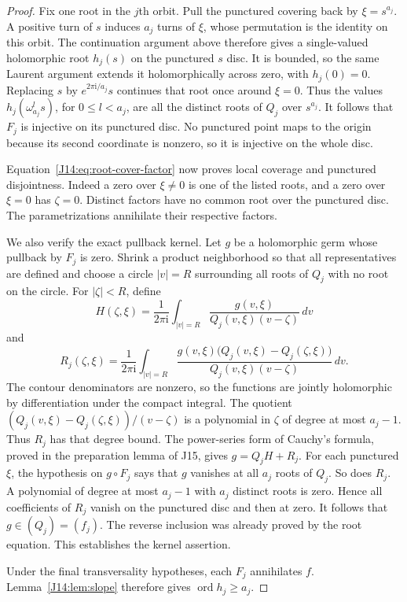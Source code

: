 \documentclass[11pt,oneside]{report}
\theoremstyle{definition}
\numberwithin{equation}{section}
\newcommand{\ord}{\operatorname{ord}}
\newcommand{\ii}{\mathrm i}
\begin{document}
\begin{proof}
Fix one root in the $j$th orbit. Pull the punctured covering back by
$\xi=s^{a_j}$. A positive turn of $s$ induces $a_j$ turns of $\xi$,
whose permutation is the identity on this orbit. The continuation
argument above therefore gives a single-valued holomorphic root
$h_j(s)$ on the punctured $s$ disc. It is bounded, so the same
Laurent argument extends it holomorphically across zero, with
$h_j(0)=0$. Replacing $s$ by $e^{2\pi\ii/a_j}s$ continues that root
once around $\xi=0$. Thus the values $h_j(\omega_{a_j}^l s)$, for
$0\leq l<a_j$, are all the distinct roots of $Q_j$ over $s^{a_j}$.
It follows that $F_j$ is injective on its punctured disc.
No punctured point maps to the origin because its second coordinate
is nonzero, so it is injective on the whole disc.

Equation~\eqref{J14:eq:root-cover-factor} now proves local coverage and
punctured disjointness. Indeed a zero over $\xi\ne0$ is one of the
listed roots, and a zero over $\xi=0$ has $\zeta=0$.
Distinct factors have no common root over the punctured disc.
The parametrizations annihilate their respective factors.

We also verify the exact pullback kernel. Let $g$ be a holomorphic
germ whose pullback by $F_j$ is zero. Shrink a product neighborhood
so that all representatives are defined and choose a circle
$|v|=R$ surrounding all roots of $Q_j$ with no root on the circle.
For $|\zeta|<R$, define
\[
 H(\zeta,\xi)=\frac1{2\pi\ii}\int_{|v|=R}
       \frac{g(v,\xi)}{Q_j(v,\xi)(v-\zeta)}\,dv
\]
and
\[
 R_j(\zeta,\xi)=\frac1{2\pi\ii}\int_{|v|=R}
 \frac{g(v,\xi)\bigl(Q_j(v,\xi)-Q_j(\zeta,\xi)\bigr)}
      {Q_j(v,\xi)(v-\zeta)}\,dv.
\]
The contour denominators are nonzero, so the functions are jointly
holomorphic by differentiation under the compact integral.
The quotient
$(Q_j(v,\xi)-Q_j(\zeta,\xi))/(v-\zeta)$ is a polynomial in
$\zeta$ of degree at most $a_j-1$. Thus $R_j$ has that degree bound.
The power-series form of Cauchy's formula, proved in the preparation
lemma of J15, gives
$g=Q_jH+R_j$.
For each punctured $\xi$, the hypothesis on $g\circ F_j$ says that
$g$ vanishes at all $a_j$ roots of $Q_j$. So does $R_j$.
A polynomial of degree at most $a_j-1$ with $a_j$ distinct roots is
zero. Hence all coefficients of $R_j$ vanish on the punctured disc
and then at zero. It follows that $g\in(Q_j)=(f_j)$.
The reverse inclusion was already proved by the root equation.
This establishes the kernel assertion.

Under the final transversality hypotheses, each $F_j$ annihilates $f$.
Lemma~\ref{J14:lem:slope} therefore gives $\ord h_j\geq a_j$.
\end{proof}
\end{document}
